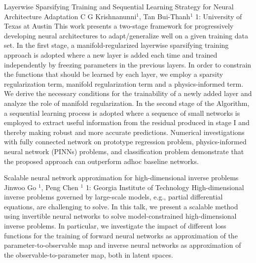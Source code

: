 \begin{addmargin}[2em]{0em}
\vspace{1.5ex}
\abs
{Layerwise Sparsifying Training and Sequential Learning Strategy for Neural Architecture Adaptation}
{C G Krishnanunni$^{1}$, Tan Bui-Thanh$^{1}$}
{1: University of Texas at Austin}
{This work presents a two-stage framework for progressively developing neural architectures to adapt/generalize well on a given training data set.  In the first stage, a manifold-regularized layerwise sparsifying training approach is adopted where a new layer is added each time and trained independently by freezing parameters in the previous layers.  In order to constrain the functions that should be learned by each layer,  we employ a sparsity regularization term, manifold regularization term and a physics-informed term. We derive the necessary conditions for the trainability of a newly added layer and analyze the role of manifold regularization. In the second stage of the Algorithm, a sequential learning process is adopted where a sequence of small networks is employed to extract useful information from the residual produced in stage I and thereby making robust and more accurate predictions. Numerical investigations with fully connected network on prototype regression problem, physics-informed neural network (PINNs) problems, and classification problem demonstrate that the proposed approach can outperform adhoc baseline networks.}


\vspace{1.5ex}
\abs
{Scalable neural network approximation for high-dimensional inverse problems}
{Jinwoo Go $^1$, Peng Chen $^1$}
{1: Georgia Institute of Technology}
{High-dimensional inverse problems governed by large-scale models, e.g., partial differential equations, are challenging to solve. In this talk, we present a scalable method using invertible neural networks to solve model-constrained high-dimensional inverse problems. In particular, we investigate the impact of different loss functions for the training of forward neural networks as approximation of the parameter-to-observable map and inverse neural networks as approximation of the observable-to-parameter map, both in latent spaces.}
\end{addmargin}


